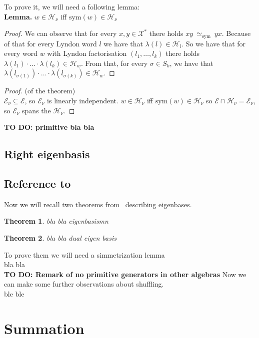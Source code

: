 \documentclass[a4paper, 12pt]{report}
\newtheorem{theorem}{Theorem}
\newcommand{\todo}[1]{\hfill \break \textbf{\Huge TO DO: #1 \hfill \break}\normalsize}
\newcommand{\SimeqSym}{{\simeq_\mathrm{sym}}}
\begin{document}
To prove it, we will need a following lemma: \\
\noindent \textbf{Lemma.} $w \in \mathcal{H}_\nu$ iff $\mathrm{sym}(w) \in \mathcal{H}_\nu$
\begin{proof}
We can observe that for every $x, y \in \mathcal{X}^*$ there holds $xy\ \SimeqSym\ yx$. Because of that
for every Lyndon word $l$ we have that $\lambda(l) \in \mathcal{H}_l$. So we have that for every word $w$
with Lyndon factorisation $(l_1,\dots, l_k)$ there holds
$\lambda(l_1)\cdot\ldots\cdot\lambda(l_k) \in \mathcal{H}_w$. From that, for every
$\sigma \in S_k$, we have that $\lambda(l_{\sigma(1)})\cdot\ldots\cdot\lambda(l_{\sigma(k)}) \in
\mathcal{H}_w$.

\end{proof}
\begin{proof}(of the theorem) \\
$\mathcal{E}_\nu \subseteq\mathcal{E}$,
so $\mathcal{E}_\nu$ is linearly independent. $w \in \mathcal{H}_\nu$ iff
$\mathrm{sym}(w) \in \mathcal{H}_\nu$ so $\mathcal{E} \cap \mathcal{H}_\nu = \mathcal{E}_\nu$, so
$\mathcal{E}_\nu$ spans the $\mathcal{H}_\nu$.
\end{proof}


\todo{primitive bla bla}
\section{Right eigenbasis}

\section{Reference to~\cite{Diaconis2014}}
Now we will recall two theorems from~\cite{Diaconis2014} describing eigenbases.
\begin{theorem}
bla bla eigenbasismn
\end{theorem}
\begin{theorem}
bla bla dual eigen basis
\end{theorem}
To prove them we will need a simmetrization lemma \\
bla bla\\[8pt]
\todo{Remark of no primitive generators in other algebras}
Now we can make some further observations about shuffling.\\
ble ble\\

\chapter{Summation}


{}

\end{document}
